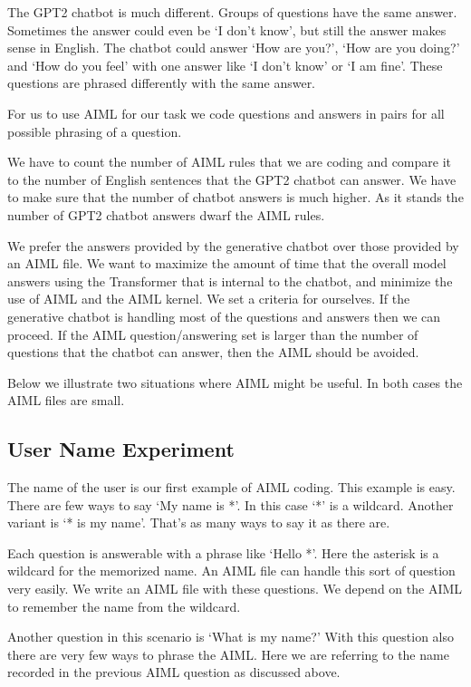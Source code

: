 The GPT2 chatbot is much different. Groups of questions have the same answer. Sometimes the answer could even be `I don't know', but still the answer makes sense in English. The chatbot could answer `How are you?', `How are you doing?' and `How do you feel' with one answer like `I don't know' or `I am fine'. These questions are phrased differently with the same answer.

For us to use AIML for our task we code questions and answers in pairs for all possible phrasing of a question.

We have to count the number of AIML rules that we are coding and compare it to the number of English sentences that the GPT2 chatbot can answer. We have to make sure that the number of chatbot answers is much higher. As it stands the number of GPT2 chatbot answers dwarf the AIML rules.

We prefer the answers provided by the generative chatbot over those provided by an AIML file. We want to maximize the amount of time that the overall model answers using the Transformer that is internal to the chatbot, and minimize the use of AIML and the AIML kernel. We set a criteria for ourselves. If the generative chatbot is handling most of the questions and answers then we can proceed. If the AIML question/answering set is larger than the number of questions that the chatbot can answer, then the AIML should be avoided. 

Below we illustrate two situations where AIML might be useful. In both cases the AIML files are small.

\subsection{User Name Experiment}
The name of the user is our first example of AIML coding. This example is easy. There are few ways to say `My name is *'. In this case `*' is a wildcard. Another variant is `* is my name'. That's as many ways to say it as there are.

Each question is answerable with a phrase like `Hello *'. Here the asterisk is a wildcard for the memorized name. An AIML file can handle this sort of question very easily. We write an AIML file with these questions. We depend on the AIML to remember the name from the wildcard. 

Another question in this scenario is `What is my name?' With this question also there are very few ways to phrase the AIML. Here we are referring to the name recorded in the previous AIML question as discussed above. 

